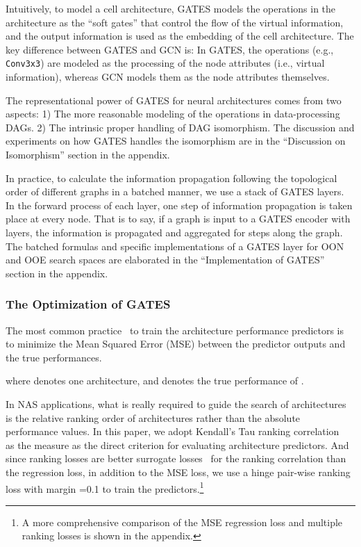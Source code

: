 \documentclass[runningheads]{llncs}
\begin{document}
Intuitively, to model a cell architecture, GATES models the operations in the architecture as the ``soft gates'' that control the flow of the virtual information, and the output information is used as the embedding of the cell architecture. 
The key difference between GATES and GCN is: In GATES, the operations (e.g., \texttt{Conv3x3}) are modeled as the processing of the node attributes (i.e., virtual information), whereas GCN models them as the node attributes themselves.


The representational power of GATES for neural architectures comes from two aspects: 1)
The more reasonable modeling of the operations in data-processing DAGs. 2) The intrinsic proper handling of DAG isomorphism. 
The discussion and experiments on how GATES handles the isomorphism are in the ``Discussion on Isomorphism'' section in the appendix.



In practice, to calculate the information propagation following the topological order of different graphs in a batched manner, we use a stack of GATES layers. In the forward process of each layer, one step of information propagation is taken place at every node. That is to say, if a graph is input to a GATES encoder with  layers, the information is propagated and aggregated for  steps along the graph. 
The batched formulas and specific implementations of a GATES layer for OON and OOE search spaces are elaborated in the ``Implementation of GATES'' section in the appendix.

\subsubsection{The Optimization of GATES}


The most common practice~\cite{liu2018progressive,nao2018} to train the architecture performance predictors is to minimize the Mean Squared Error (MSE) between the predictor outputs and the true performances.

where  denotes one architecture, and  denotes the true performance of .


In NAS applications, what is really required to guide the search of architectures is the relative ranking order of architectures rather than the absolute performance values. In this paper, we adopt Kendall's Tau ranking correlation~\cite{sen1968estimates} as the measure as the direct criterion for evaluating architecture predictors. And since ranking losses are better surrogate losses~\cite{chen2009,liu2009learning,xu2019renas} for the ranking correlation than the regression loss, 
in addition to the MSE loss,
we use a hinge pair-wise ranking loss with margin =0.1 to train the predictors.\footnote{A more comprehensive comparison of the MSE regression loss and multiple ranking losses is shown in the appendix.}
\end{document}
